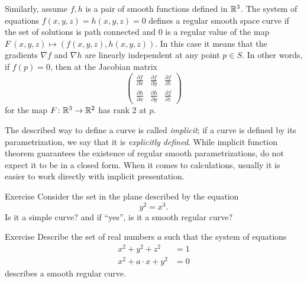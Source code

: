 Similarly, assume $f,h$ is a pair of smooth functions defined in $\mathbb{R}^3$.
The system of equations
$f(x,y,z)=h(x,y,z)=0$
defines a regular smooth space curve if the set of solutions is path connected and $0$ is a regular value of the map $F\:(x,y,z)\mapsto (f(x,y,z),h(x,y,z))$.
In this case it means that the gradients $\nabla f$ and $\nabla h$ are linearly independent at any point $p\in S$.
In other words, if $f(p)=0$, then at the Jacobian matrix
\[
\begin{pmatrix}
\tfrac{\partial f}{\partial x}&\tfrac{\partial f}{\partial y}&\tfrac{\partial f}{\partial z}\\
\tfrac{\partial h}{\partial x}&\tfrac{\partial h}{\partial y}&\tfrac{\partial f}{\partial z}
\end{pmatrix}
\]
for the map $F\colon\mathbb{R}^3\to\mathbb{R}^2$ has rank 2 at $p$.

The described way to define a curve is called \emph{implicit};
if a curve is defined by its parametrization, we say that it is \emph{explicitly defined}.
While implicit function theorem guarantees the existence of regular smooth parametrizations, do not expect it to be in a closed form. 
When it comes to calculations, usually it is easier to work directly with implicit presentation. 

\begin{thm}{Exercise}
Consider the set in the plane described by the equation
\[y^2=x^3.\]
Is it a simple curve? and if ``yes'', is it a smooth regular curve?
\end{thm}

\begin{thm}{Exercise}\label{ex:viviani}
Describe the set of real numbers $a$
such that the system of equations
\begin{align*}
x^2+y^2+z^2&=1
\\
x^2+a\cdot x+y^2&=0
\end{align*}
describes a smooth regular curve.
\end{thm}



